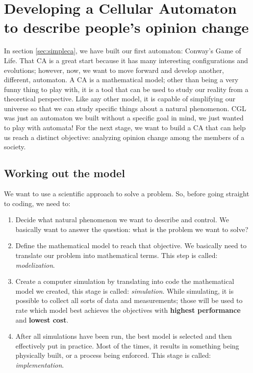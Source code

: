%
%
%

\chapter[A Cellular Automaton to describe opinion change]{Developing a
Cellular Automaton to describe people's opinion change}
\label{sec:opinionca}

In section \ref{sec:simpleca}, we have built our first automaton: Conway's Game of Life.
That CA is a great start because it has many interesting configurations and evolutions;
however, now, we want to move forward and develop another, different, automaton.
A CA is a mathematical model; other than being a very funny thing to play with, it is a
tool that can be used to study our reality from a theoretical perspective. Like any other
model, it is capable of simplifying our universe so that we can study specific things
about a natural phenomenon. CGL was just an automaton we built without a specific goal
in mind, we just wanted to play with automata!
For the next stage, we want to build a CA that can help us reach a distinct objective:
analyzing opinion change among the members of a society.

\section{Working out the model}
We want to use a scientific approach to solve a problem. So, 
before going straight to coding, we need to:

\begin{enumerate}
\item Decide what natural phenomenon we want to describe and control. 
We basically want to answer the question: what is the problem we want to solve?
\item Define the mathematical model to reach that objective. We 
basically need to translate
our problem into mathematical terms. This step is called: \textit{modelization}.
\item Create a computer simulation by translating into code the mathematical
model we created, this stage is called: \textit{simulation}. While simulating,
it is possible to collect all sorts of data and measurements; those will be used
to rate which model best achieves the objectives with \textbf{highest performance} and
\textbf{lowest cost}.
\item After all simulations have been run, the best model is selected and then
effectively put in practice. Most of the times, it results in something being
physically built, or a process being enforced. This stage is called:
\textit{implementation}.
\end{enumerate}

